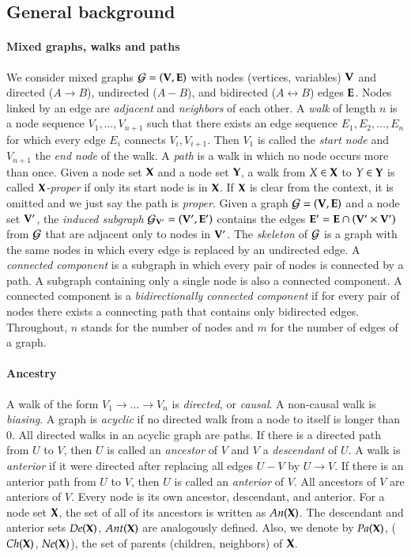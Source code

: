 \subsection{General background}
\paragraph{Mixed graphs, walks and paths}
We consider mixed graphs ${\cal G}=({\bf V},{\bf E})$ with
nodes (vertices, variables)
${\bf V}$ and directed
($A \to B$), undirected ($A-B$), and bidirected
($A \leftrightarrow B$) edges ${\bf E}$. Nodes linked
by an edge are \emph{adjacent} and \emph{neighbors} of each other.
A  \emph{walk} of length $n$ is a node
sequence $V_1,\ldots,V_{n+1}$  such that
there exists an edge sequence
$E_1,E_2,\ldots,E_{n}$ for which every edge $E_i$ 
connects $V_{i},V_{i+1}$. Then $V_1$ is called 
the \emph{start node} and $V_{n+1}$ the \emph{end node}
of the walk.
A \emph{path} is a walk in which no node occurs
more than once. Given a node set ${\bf X}$ and a node set
${\bf Y}$, a walk from $X \in {\bf X}$ to $Y\in{\bf Y}$  is called
\emph{$ {\bf X} $-proper} if only its start node is in ${\bf X}$. 
If $ {\bf X} $ is clear from the context, it is omitted and we just say the path is \emph{proper}.
Given a graph ${\cal G}=({\bf V},{\bf E})$ and a node set ${\bf V}'$,
the \emph{induced subgraph} ${\cal G}_{{\bf V}'}=({\bf V}',{\bf E}')$ contains
the edges ${\bf E}' = {\bf E}\cap ({\bf V}'\times{\bf V}')$ from ${\cal G}$ that
are adjacent only to nodes in ${\bf V}'$. The \emph{skeleton} of ${\cal G}$ is a graph with the same nodes in which every edge is replaced by an undirected edge.
A \emph{connected component} is a subgraph in which every pair of nodes is connected by a path. A subgraph containing only a single node is also a connected component.
A connected component is a \emph{bidirectionally connected component} if for every pair of nodes there exists a connecting path that contains only bidirected edges.  
Throughout, $n$ stands for the number of nodes and $m$ for the
number of edges of a graph. 

\paragraph{Ancestry} A walk of the form $V_1 \to \ldots \to V_n$ 
is \emph{directed}, or \emph{causal}. A non-causal walk is \emph{biasing}.
A graph is \emph{acyclic} if no 
directed walk from a node to itself 
is longer than $0$.
All directed walks in an acyclic
graph are paths. 
If there is a directed path from $U$ to $V$, 
then $U$ is called an
\emph{ancestor} of $V$ and $V$ a \emph{descendant} of $U$.
A walk is \emph{anterior} if it were
directed after replacing all edges 
$U - V$ by $U \to V$.
If there is an anterior path from $U$ to $V$, then
$U$ is called an \emph{anterior} of $V$. 
All ancestors of $V$ are anteriors of $V$.
Every node is its own ancestor,
descendant, and anterior.
For a node set ${\bf X}$, the set of all of its ancestors 
is written as $\textit{An}({\bf X})$. The descendant and
anterior sets $\textit{De}({\bf X})$, $\textit{Ant}({\bf X})$ are
analogously defined.
Also, we denote by $\textit{Pa}({\bf X})$, 
($\textit{Ch}({\bf X})$, $\textit{Ne}({\bf X})$), the set of parents (children, neighbors)
of ${\bf X}$.

